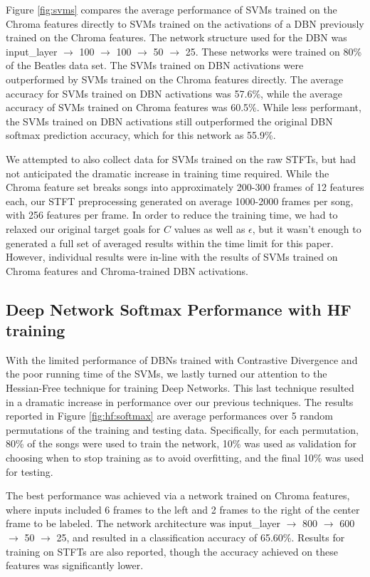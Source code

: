 \documentclass{article}
\begin{document}
Figure \ref{fig:svms} compares the average performance of SVMs trained on the
Chroma features directly to SVMs trained on the activations of a DBN previously
trained on the Chroma features. The network structure used for the DBN was
input\_layer $\rightarrow$ 100 $\rightarrow$ 100 $\rightarrow$ 50 $\rightarrow$
25. These networks were trained on 80\% of the Beatles data set. The SVMs
trained on DBN activations were outperformed by SVMs trained on the Chroma
features directly.  The average accuracy for SVMs trained on DBN activations
was 57.6\%, while the average accuracy of SVMs trained on Chroma features was
60.5\%. While less performant, the SVMs trained on DBN activations still
outperformed the original DBN softmax prediction accuracy, which for this
network as 55.9\%.

We attempted to also collect data for SVMs trained on the raw STFTs, but had
not anticipated the dramatic increase in training time required. While the
Chroma feature set breaks songs into approximately 200-300 frames of 12
features each, our STFT preprocessing generated on average 1000-2000
frames per song, with 256 features per frame. In order to reduce the training
time, we had to relaxed our original target goals for $C$ values as well as
$\epsilon$, but it wasn't enough to generated a full set of averaged results
within the time limit for this paper. However, individual results were in-line
with the results of SVMs trained on Chroma features and Chroma-trained DBN
activations.


\subsection{Deep Network Softmax Performance with HF training}

With the limited performance of DBNs trained with Contrastive Divergence and
the poor running time of the SVMs, we lastly turned our attention to the
Hessian-Free technique for training Deep Networks. This last technique resulted
in a dramatic increase in performance over our previous techniques. The results
reported in Figure \ref{fig:hf:softmax} are average performances over 5 random
permutations of the training and testing data. Specifically, for each
permutation, 80\% of the songs were used to train the network, 10\% was used
as validation for choosing when to stop training as to avoid overfitting, 
and the final 10\% was used for testing.

The best performance was achieved via a network trained on Chroma features,
where inputs included 6 frames to the left and 2 frames to the right of the
center frame to be labeled. The network architecture was input\_layer
$\rightarrow$ 800 $\rightarrow$ 600 $\rightarrow$ 50 $\rightarrow$ 25, and
resulted in a classification accuracy of 65.60\%. Results for training on STFTs
are also reported, though the accuracy achieved on these features was
significantly lower.
\end{document}
